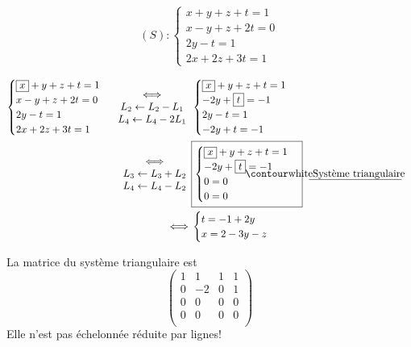 \begin{exm}
	\[
		(S): \begin{cases}
			x + y + z + t = 1\\
			x - y + z + 2t = 0\\
			2y - t = 1\\
			2x + 2z + 3t = 1
		\end{cases}
	\] 

	\begin{align*}
		\begin{cases}
			\bx x + y + z + t = 1\\
			x - y + z + 2t = 0\\
			2y - t = 1\\
			2x + 2z + 3t = 1
		\end{cases}
		\begin{array}{c}
			\iff\\
			L_2 \leftarrow L_2 - L_1\\
			L_4 \leftarrow L_4 - 2L_1
		\end{array}&
		\begin{cases}
			\bx x +y +z + t = 1\\
			-2y + \bx t = -1\\
			2y - t = 1\\
			-2y + t = -1
		\end{cases}\\
		\begin{array}{c}
			\iff\\
			L_3 \leftarrow L_3 + L_2\\
			L_4 \leftarrow L_4 - L_2
		\end{array}&
		\fbox{$
			\begin{cases}
				\bx x + y + z + t = 1\\
				-2y + \bx t = -1\\
				0=0\\
				0=0
			\end{cases}
		$} \text{ \underline{Système triangulaire} }\\
		\iff& \begin{cases}
			t = -1+2y\\
			x = 2-3y -z
		\end{cases}
	\end{align*}

	La matrice du système triangulaire est \[
		\begin{pmatrix}
			1 & 1 & 1 & 1\\
			0 & -2 & 0 & 1\\
			0 & 0 & 0 & 0\\
			0 & 0 & 0 & 0\\
		\end{pmatrix} 
	\]
	Elle n'est pas échelonnée réduite par lignes!
\end{exm}

